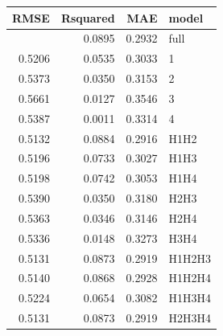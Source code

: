 \documentclass[
  letterpaper,
  DIV=11,
  numbers=noendperiod]{scrreprt}
\newenvironment{Shaded}{\begin{snugshade}}{\end{snugshade}}
\newcommand{\AttributeTok}[1]{\textcolor[rgb]{0.40,0.45,0.13}{#1}}
\newcommand{\CommentTok}[1]{\textcolor[rgb]{0.37,0.37,0.37}{#1}}
\newcommand{\DecValTok}[1]{\textcolor[rgb]{0.68,0.00,0.00}{#1}}
\newcommand{\FunctionTok}[1]{\textcolor[rgb]{0.28,0.35,0.67}{#1}}
\newcommand{\NormalTok}[1]{\textcolor[rgb]{0.00,0.23,0.31}{#1}}
\newcommand{\OtherTok}[1]{\textcolor[rgb]{0.00,0.23,0.31}{#1}}
\newcommand{\SpecialCharTok}[1]{\textcolor[rgb]{0.37,0.37,0.37}{#1}}
\newcommand{\StringTok}[1]{\textcolor[rgb]{0.13,0.47,0.30}{#1}}
\begin{document}
\begin{longtable}[]{@{}rrrl@{}}
\toprule\noalign{}
RMSE & Rsquared & MAE & model \\
\midrule\noalign{}
\endhead
\bottomrule\noalign{}
\endlastfoot
0.5129 & 0.0895 & 0.2932 & full \\
0.5206 & 0.0535 & 0.3033 & 1 \\
0.5373 & 0.0350 & 0.3153 & 2 \\
0.5661 & 0.0127 & 0.3546 & 3 \\
0.5387 & 0.0011 & 0.3314 & 4 \\
0.5132 & 0.0884 & 0.2916 & H1H2 \\
0.5196 & 0.0733 & 0.3027 & H1H3 \\
0.5198 & 0.0742 & 0.3053 & H1H4 \\
0.5390 & 0.0350 & 0.3180 & H2H3 \\
0.5363 & 0.0346 & 0.3146 & H2H4 \\
0.5336 & 0.0148 & 0.3273 & H3H4 \\
0.5131 & 0.0873 & 0.2919 & H1H2H3 \\
0.5140 & 0.0868 & 0.2928 & H1H2H4 \\
0.5224 & 0.0654 & 0.3082 & H1H3H4 \\
0.5131 & 0.0873 & 0.2919 & H2H3H4 \\
\end{longtable}

\begin{Shaded}
\end{Shaded}
\end{document}
